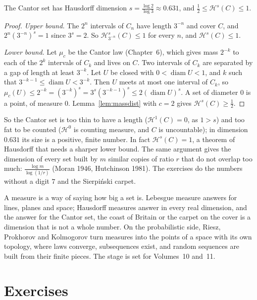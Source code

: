 \begin{theorem}\label{thm:cantordim}
The Cantor set has Hausdorff dimension $s=\frac{\log2}{\log3}\approx0.631$, and $\frac12\le\mathcal H^s(C)\le1$.
\end{theorem}
\begin{proof}
\emph{Upper bound.} The $2^n$ intervals of $C_n$ have length $3^{-n}$ and cover $C$, and $2^n(3^{-n})^s=1$ since $3^s=2$. So $\mathcal H^s_{3^{-n}}(C)\le1$ for every $n$, and $\mathcal H^s(C)\le1$.

\emph{Lower bound.} Let $\mu_c$ be the Cantor law (Chapter~6), which gives mass $2^{-k}$ to each of the $2^k$ intervals of $C_k$ and lives on $C$. Two intervals of $C_k$ are separated by a gap of length at least $3^{-k}$.
Let $U$ be closed with $0<\operatorname{diam}U<1$, and $k$ such that $3^{-k-1}\le\operatorname{diam}U<3^{-k}$. Then $U$ meets at most one interval of $C_k$, so
$\mu_c(U)\le2^{-k}=(3^{-k})^s=3^s(3^{-k-1})^s\le2(\operatorname{diam}U)^s$. A set of diameter $0$ is a point, of measure $0$. Lemma~\ref{lem:massdist} with $c=2$ gives $\mathcal H^s(C)\ge\frac12$.
\end{proof}

So the Cantor set is too thin to have a length ($\mathcal H^1(C)=0$, as $1>s$) and too fat to be counted ($\mathcal H^0$ is counting measure, and $C$ is uncountable); in dimension $0.631$ its size is a positive, finite number.
In fact $\mathcal H^s(C)=1$, a theorem of Hausdorff that needs a sharper lower bound. The same argument gives the dimension of every set built by $m$ similar copies of ratio $r$ that do not overlap too much:
$\frac{\log m}{\log(1/r)}$ (Moran 1946, Hutchinson 1981). The exercises do the numbers without a digit $7$ and the Sierpi\'nski carpet.

\begin{beauty}
A measure is a way of saying how big a set is. Lebesgue measure answers for lines, planes and space; Hausdorff measures answer in every real dimension, and the answer for the Cantor set, the coast of
Britain or the carpet on the cover is a dimension that is not a whole number. On the probabilistic side, Riesz, Prokhorov and Kolmogorov turn measures into the points of a space with its own topology, where laws
converge, subsequences exist, and random sequences are built from their finite pieces. The stage is set for Volumes~10 and~11.
\end{beauty}

\section{Exercises}

